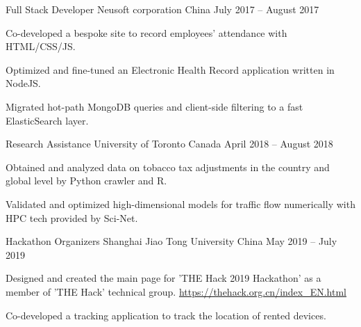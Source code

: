 

\begin{cventries}

  \cventry
    {Full Stack Developer} %
    {Neusoft corporation} %
    {China} %
    {July 2017 – August 2017} %
    {
      \begin{cvitems} %
        \item {Co-developed a bespoke site to record employees’ attendance with HTML/CSS/JS.}
        \item {Optimized and fine-tuned an Electronic Health Record application written in NodeJS.}
        \item {Migrated hot-path MongoDB queries and client-side filtering to a fast ElasticSearch layer.}
      \end{cvitems}
    }

  \cventry
    {Research Assistance} %
    {University of Toronto} %
    {Canada} %
    {April 2018 – August 2018} %
    {
      \begin{cvitems} %
        \item {Obtained and analyzed data on tobacco tax adjustments in the country and global level by Python crawler and R.}
        \item {Validated and optimized high-dimensional models for traffic flow numerically with HPC tech provided by Sci-Net.}
      \end{cvitems}
    }

  \cventry
    {Hackathon Organizers} %
    {Shanghai Jiao Tong University} %
    {China} %
    {May 2019 – July 2019} %
    {
      \begin{cvitems} %
        \item {Designed and created the main page for 'THE Hack 2019 Hackathon' as a member of 'THE Hack' technical group. \qquad \url{https://thehack.org.cn/index_EN.html}}
        \item {Co-developed a tracking application to track the location of rented devices.}
      \end{cvitems}
    }
\end{cventries}

